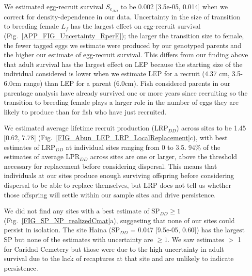 \documentclass[12pt, oneside]{article}   	%
\begin{document}
We estimated egg-recruit survival $S_{e_{DD}}$ to be 0.002 [3.5e-05, 0.014] when we correct for density-dependence in our data. Uncertainty in the size of transition to breeding female $L_f$ has the largest effect on egg-recruit survival (Fig.\ \ref{APP_FIG_Uncertainty_RperE}); the larger the transition size to female, the fewer tagged eggs we estimate were produced by our genotyped parents and the higher our estimate of egg-recruit survival. This differs from our finding above that adult survival has the largest effect on LEP because the starting size of the individual considered is lower when we estimate LEP for a recruit (4.37 cm, 3.5-6.0cm range) than LEP for a parent (6.0cm). Fish considered parents in our parentage analysis have already survived one or more years since recruiting so the transition to breeding female plays a larger role in the number of eggs they are likely to produce than for fish who have just recruited. 

We estimated average lifetime recruit production ($\text{LRP}_{DD}$) across sites to be 1.45 [0.62, 7.78] (Fig.\ \ref{FIG_Abun_LEP_LRP_LocalReplacement}c), with best estimates of $\text{LRP}_{DD}$ at individual sites ranging from 0 to 3.5. 94\% of the estimates of average $\text{LPR}_{DD}$ across sites are one or larger, above the threshold necessary for replacement before considering dispersal. This means that individuals at our sites produce enough surviving offspring before considering dispersal to be able to replace themselves, but LRP does not tell us whether those offspring will settle within our sample sites and drive persistence. 

We did not find any sites with a best estimate of $\text{SP}_{DD} \geq 1$ (Fig.\ \ref{FIG_SP_NP_realizedCmat}a), suggesting that none of our sites could persist in isolation. The site Haina ($\text{SP}_{DD}$ = 0.047 [9.5e-05, 0.60]) has the largest SP but none of the estimates with uncertainty are $\geq 1$. We saw estimates $>$ 1 for Caridad Cemetery but those were due to the high uncertainty in adult survival due to the lack of recaptures at that site and are unlikely to indicate persistence.

\end{document}
